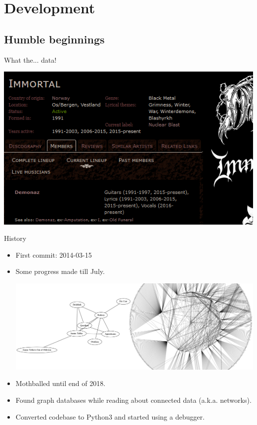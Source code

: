 \documentclass{beamer}
\begin{document}
\section{Development}

  \subsection{Humble beginnings}

    \begin{frame}{What the... data!}
    
      \begin{center}
        \includegraphics[scale=2.1]{MA_Immortal}
      \end{center}
    
    \end{frame}

    \begin{frame}{History}

      \begin{itemize}

        \item<1-> First commit: 2014-03-15
        \item<1-> Some progress made till July.
          \begin{center}
            \includegraphics[scale=.6]{bandsGraphCombined}
          \end{center}
        \item<2-> Mothballed until end of 2018.
        \item<2-> Found graph databases while reading about connected data
          (a.k.a. networks).
        \item<2-> Converted codebase to Python3 and started using a debugger.
      \end{itemize}

    \end{frame}
    
\end{document}
